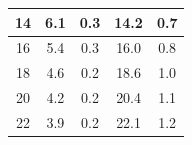 \begin{table}
\begin{tabular}{|c|c|c|c|c|}
14                                                                         & 6.1                                                                                                                       & 0.3                                                                                               & 14.2                                                                                         & 0.7                                                                                         \\ \hline
16                                                                         & 5.4                                                                                                                       & 0.3                                                                                               & 16.0                                                                                         & 0.8                                                                                         \\ \hline
18                                                                         & 4.6                                                                                                                       & 0.2                                                                                               & 18.6                                                                                         & 1.0                                                                                         \\ \hline
20                                                                         & 4.2                                                                                                                       & 0.2                                                                                               & 20.4                                                                                         & 1.1                                                                                         \\ \hline
22                                                                         & 3.9                                                                                                                       & 0.2                                                                                               & 22.1                                                                                         & 1.2                                                                                         \\ \hline

\end{tabular}
\end{table}
